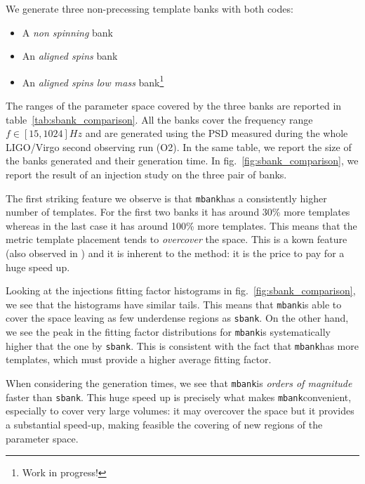 \documentclass[twocolumn,showpacs,preprintnumbers,nofootinbib,prd,
superscriptaddress,10pt]{revtex4-2}
\newcommand{\mbank}{\texttt{mbank}}
\begin{document}
We generate three non-precessing template banks with both codes:
\begin{itemize}
	\item A {\it non spinning} bank
	\item An {\it aligned spins} bank
	\item An {\it aligned spins low mass} bank\footnote{Work in progress!}
\end{itemize}
The ranges of the parameter space covered by the three banks are reported in table~\ref{tab:sbank_comparison}. All the banks cover the frequency range $f\in [15,1024] Hz$ and are generated using the PSD measured during the whole LIGO/Virgo second observing run (O2).
In the same table, we report the size of the banks generated and their generation time. In fig.~\ref{fig:sbank_comparison}, we report the result of an injection study on the three pair of banks.

The first striking feature we observe is that \mbank has a consistently higher number of templates. For the first two banks it has around 30\% more templates whereas in the last case it has around 100\% more templates. This means that the metric template placement tends to \textit{overcover} the space. This is a kown feature (also observed in \cite{}) and it is inherent to the method: it is the price to pay for a huge speed up.

Looking at the injections fitting factor histograms in fig.~\ref{fig:sbank_comparison}, we see that the histograms have similar tails. This means that \mbank is able to cover the space leaving as few underdense regions as \texttt{sbank}. On the other hand, we see the peak in the fitting factor distributions for \mbank is systematically higher that the one by \texttt{sbank}. This is consistent with the fact that \mbank has more templates, which must provide a higher average fitting factor.

When considering the generation times, we see that \mbank is {\it orders of magnitude} faster than \texttt{sbank}. This huge speed up is precisely what makes \mbank convenient, especially to cover very large volumes: it may overcover the space but it provides a substantial speed-up, making feasible the covering of new regions of the parameter space.

\end{document}
